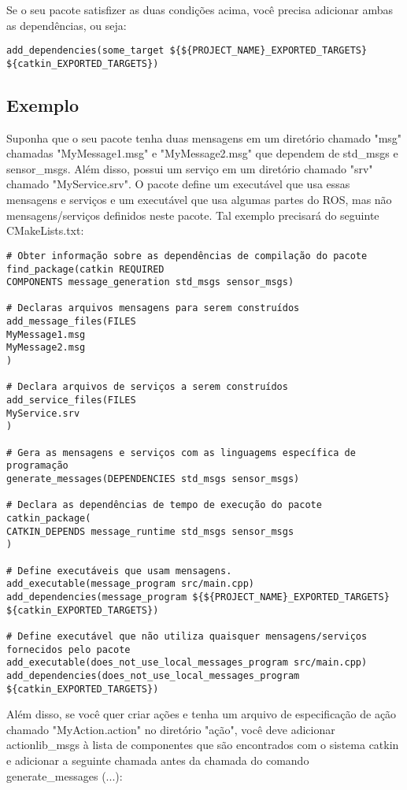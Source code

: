 Se o seu pacote satisfizer as duas condições acima, você precisa adicionar ambas as dependências, ou seja:

\begin{verbatim}
add_dependencies(some_target ${${PROJECT_NAME}_EXPORTED_TARGETS} ${catkin_EXPORTED_TARGETS})
\end{verbatim}

\subsection{Exemplo}

Suponha que o seu pacote tenha duas mensagens em um diretório chamado "msg" chamadas "MyMessage1.msg" e "MyMessage2.msg" que dependem de std\_msgs e sensor\_msgs. Além disso, possui um serviço em um diretório chamado "srv" chamado "MyService.srv". O pacote define um executável que usa essas mensagens e serviços e um executável que usa algumas partes do ROS, mas não mensagens/serviços definidos neste pacote. Tal exemplo precisará do seguinte CMakeLists.txt:

\begin{verbatim}
# Obter informação sobre as dependências de compilação do pacote
find_package(catkin REQUIRED
COMPONENTS message_generation std_msgs sensor_msgs)

# Declaras arquivos mensagens para serem construídos
add_message_files(FILES
MyMessage1.msg
MyMessage2.msg
)

# Declara arquivos de serviços a serem construídos
add_service_files(FILES
MyService.srv
)

# Gera as mensagens e serviços com as linguagems específica de programação
generate_messages(DEPENDENCIES std_msgs sensor_msgs)

# Declara as dependências de tempo de execução do pacote
catkin_package(
CATKIN_DEPENDS message_runtime std_msgs sensor_msgs
)

# Define executáveis que usam mensagens.
add_executable(message_program src/main.cpp)
add_dependencies(message_program ${${PROJECT_NAME}_EXPORTED_TARGETS} ${catkin_EXPORTED_TARGETS})

# Define executável que não utiliza quaisquer mensagens/serviços fornecidos pelo pacote
add_executable(does_not_use_local_messages_program src/main.cpp)
add_dependencies(does_not_use_local_messages_program ${catkin_EXPORTED_TARGETS})
\end{verbatim}

Além disso, se você quer criar ações e tenha um arquivo de especificação de ação chamado "MyAction.action" no diretório "ação", você deve adicionar actionlib\_msgs à lista de componentes que são encontrados com o sistema catkin e adicionar a seguinte chamada antes da chamada do comando generate\_messages (...):

